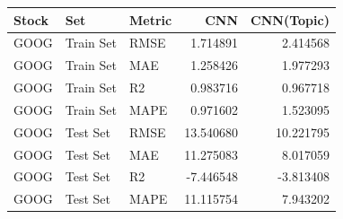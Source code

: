 \begin{tabular}{lllrr}
\toprule
Stock & Set & Metric & CNN & CNN(Topic) \\
\midrule
GOOG & Train Set & RMSE & 1.714891 & 2.414568 \\
GOOG & Train Set & MAE & 1.258426 & 1.977293 \\
GOOG & Train Set & R2 & 0.983716 & 0.967718 \\
GOOG & Train Set & MAPE & 0.971602 & 1.523095 \\
GOOG & Test Set & RMSE & 13.540680 & 10.221795 \\
GOOG & Test Set & MAE & 11.275083 & 8.017059 \\
GOOG & Test Set & R2 & -7.446548 & -3.813408 \\
GOOG & Test Set & MAPE & 11.115754 & 7.943202 \\
\bottomrule
\end{tabular}
